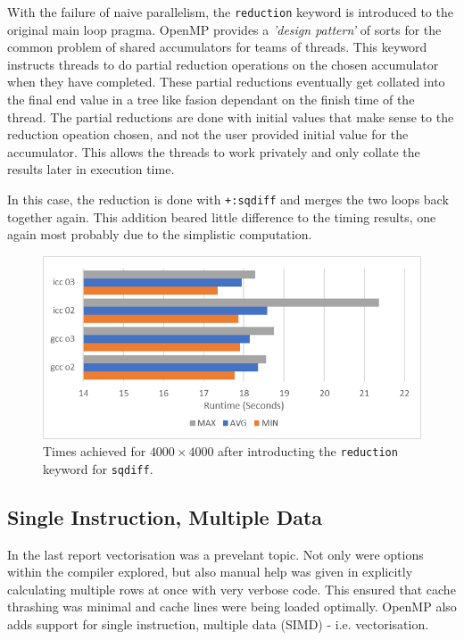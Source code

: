 \documentclass[11pt,twocolumn,a4paper]{article}
\begin{document}
With the failure of naive parallelism, the \texttt{reduction} keyword is introduced to the original main loop pragma. OpenMP provides a \textit{'design pattern'} of sorts for the common problem of shared accumulators for teams of threads. This keyword instructs threads to do partial reduction operations on the chosen accumulator when they have completed. These partial reductions eventually get collated into the final end value in a tree like fasion dependant on the finish time of the thread. The partial reductions are done with initial values that make sense to the reduction opeation chosen, and not the user provided initial value for the accumulator. This allows the threads to work privately and only collate the results later in execution time. \par

In this case, the reduction is done with \texttt{+:sqdiff} and merges the two loops back together again. This addition beared little difference to the timing results, one again most probably due to the simplistic computation.

\begin{figure}[h]
        \centering
        \includegraphics[width=0.8\linewidth]{figures/3-INNER-REDUX.png}
        \caption{Times achieved for $4000\times4000$ after introducting the \texttt{reduction} keyword for \texttt{sqdiff}.}
        \label{fig-3-redux}
\end{figure}


\subsection{Single Instruction, Multiple Data}
In the last report vectorisation was a prevelant topic. Not only were options within the compiler explored, but also manual help was given in explicitly calculating multiple rows at once with very verbose code. This ensured that cache thrashing was minimal and cache lines were being loaded optimally. OpenMP also adds support for single instruction, multiple data (SIMD) - i.e. vectorisation. \par
\end{document}
